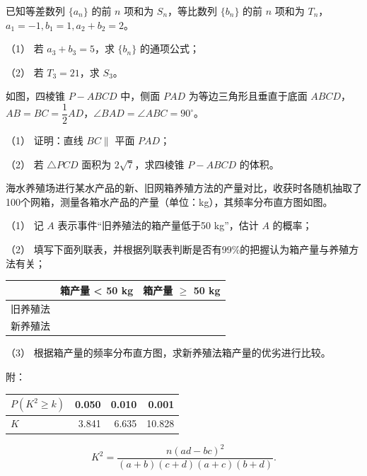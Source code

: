 \begin{question}
已知等差数列 \(\{a_n\}\) 的前 \(n\) 项和为 \(S_n\)，等比数列 \(\{b_n\}\) 的前 \(n\) 项和为 \(T_n\)，\(a_1=-1,b_1=1,a_2+b_2=2\)。

（1） 若 \(a_3+b_3=5\)，求 \(\{b_n\}\) 的通项公式；

（2） 若 \(T_3=21\)，求 \(S_3\)。

\Needspace{0.4\textheight}
\end{question}
\begin{question}
如图，四棱锥 \(P-ABCD\) 中，侧面 \(PAD\) 为等边三角形且垂直于底面 \(ABCD\)，\(AB=BC=\dfrac12 AD\)，\(\angle BAD=\angle ABC=90^\circ\)。
\nopagebreak[4]
\begin{center}\end{center}
\nopagebreak[4]
（1） 证明：直线 \(BC\parallel\) 平面 \(PAD\)；

（2） 若 \(\triangle PCD\) 面积为 \(2\sqrt7\)，求四棱锥 \(P-ABCD\) 的体积。

\Needspace{0.4\textheight}
\end{question}
\begin{question}
海水养殖场进行某水产品的新、旧网箱养殖方法的产量对比，收获时各随机抽取了100个网箱，测量各箱水产品的产量（单位：kg），其频率分布直方图如图。
\nopagebreak[4]
\begin{center}\end{center}
\nopagebreak[4]
（1） 记 \(A\) 表示事件“旧养殖法的箱产量低于50 kg”，估计 \(A\) 的概率；

（2） 填写下面列联表，并根据列联表判断是否有99\%的把握认为箱产量与养殖方法有关；

\begin{center}
\begin{tabular}{lrr}
\toprule
 & 箱产量 < 50 kg & 箱产量 $\geq$ 50 kg \\
\midrule
旧养殖法 &  &  \\
新养殖法 &  &  \\
\bottomrule
\end{tabular}
\end{center}

（3） 根据箱产量的频率分布直方图，求新养殖法箱产量的优劣进行比较。

附：

\begin{center}
\begin{tabular}{lrrr}
\toprule
\(P(K^2\ge k)\) & 0.050 & 0.010 & 0.001 \\
\midrule
\(K\) & 3.841 & 6.635 & 10.828 \\
\bottomrule
\end{tabular}
\end{center}

\nopagebreak[4]
\[
K^2=\frac{n(ad-bc)^2}{(a+b)(c+d)(a+c)(b+d)}.
\]

\end{question}
